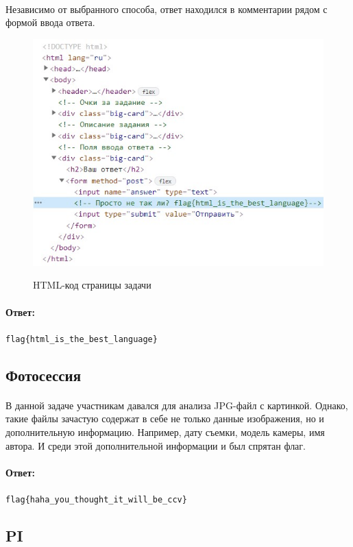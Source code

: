 \documentclass[12pt]{article}
\begin{document}
	\paragraph{}
	Независимо от выбранного способа, ответ находился в комментарии рядом с формой ввода ответа.
    \begin{figure}[H]
        \centering
        \includegraphics[width=12cm]{task45}
        \label{fig:task45}
        \caption{HTML-код страницы задачи}
    \end{figure}
    \paragraph{Ответ:}
    \verb|flag{html_is_the_best_language}|

    \subsection{Фотосессия}
	\paragraph{}
    В данной задаче участникам давался для анализа JPG-файл с картинкой.
	Однако, такие файлы зачастую содержат в себе не только данные изображения, но и дополнительную информацию.
	Например, дату съемки, модель камеры, имя автора.
	И среди этой дополнительной информации и был спрятан флаг.
    \paragraph{Ответ:}
    \verb|flag{haha_you_thought_it_will_be_ccv}|

    \subsection{PI}
\end{document}
